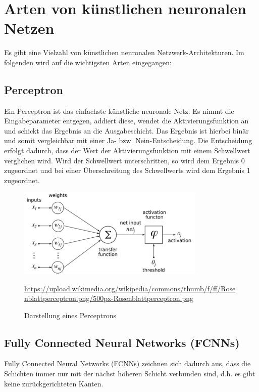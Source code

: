 \section{Arten von  künstlichen neuronalen Netzen}

Es gibt eine Vielzahl von künstlichen neuronalen Netzwerk-Architekturen. Im folgenden wird auf die wichtigsten Arten eingegangen:

\subsection{Perceptron}

	Ein Perceptron ist das einfachste künstliche neuronale Netz. Es nimmt die Eingabeparameter entgegen, addiert diese, wendet die Aktivierungsfunktion an und schickt das Ergebnis an die Ausgabeschicht. Das Ergebnis ist hierbei binär und somit vergleichbar mit einer Ja- bzw. Nein-Entscheidung. Die Entscheidung erfolgt dadurch, dass der Wert der Aktivierungsfunktion mit einem Schwellwert verglichen wird. Wird der Schwellwert unterschritten, so wird dem Ergebnis 0 zugeordnet und bei einer Überschreitung des Schwellwerts wird dem Ergebnis 1 zugeordnet.
	
	\begin{figure}[H]
		\centering
		\includegraphics[width=0.8\textwidth]{kapitel3/images/perceptron.png}
		\caption{Darstellung eines Perceptrons}
		\vspace{0.2cm}
		\quelle\url{https://upload.wikimedia.org/wikipedia/commons/thumb/f/ff/Rosenblattperceptron.png/500px-Rosenblattperceptron.png}
		\end{figure}

\subsection{Fully Connected Neural Networks (FCNNs)}

	Fully Connected Neural Networks (FCNNs) zeichnen sich dadurch aus, dass die Schichten immer nur mit der nächst höheren Schicht verbunden sind, d.h. es gibt keine zurückgerichteten Kanten. \cite{datasolut4}
	
